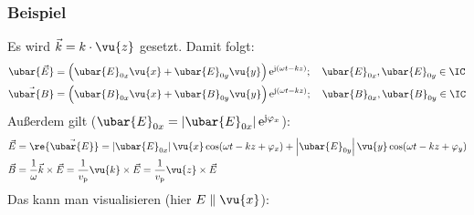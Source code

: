   \subsubsection{Beispiel}        
     Es wird \(\vec{k} =  k \cdot \vu{z}\) gesetzt. Damit folgt:
      \begin{equation*}\begin{split}
         \ubar{\vec{E}}&=\left( \ubar{E}_{0x} \vu{x} + \ubar{E}_{0y}\vu{y}\right)  \mathrm{e}^{\mathrm{j}(\omega t - k z)}  ;\quad \ubar{E}_{0x}, \ubar{E}_{0y} \in \IC\\
        \vec{\ubar{B}} &= \left( \ubar{B}_{0x} \vu{x} + \ubar{B}_{0y}\vu{y}\right) \mathrm{e}^{\mathrm{j}(\omega t -  k z)}  ;\quad \ubar{B}_{0x}, \ubar{B}_{0y} \in \IC
       \end{split}\end{equation*}
	Außerdem gilt ($\ubar{E}_{0x}=\left|\ubar{E}_{0x}\right|\mathrm{e}^{\mathrm{j}\varphi_x}$):
		        \begin{equation*}\begin{split}
		        \vec{E}&=\re{\vec{\ubar{E}}}=\left|\ubar{E}_{0x}\right|\vu{x}\cos (\omega t - kz +\varphi_x)+\left|\ubar{E}_{0y}\right|\vu{y}\cos (\omega t - kz +\varphi_y)\\
			      \vec{B} &= \frac{1}{\omega}\vec{k}\times \vec{E} =  \frac{1}{ v_{\mathrm{p}}}\vu{k}\times\vec{E} = \frac{1}{ v_{\mathrm{p}}}\vu{z}\times\vec{E}       
		        \end{split}\end{equation*}
		 Das kann man visualisieren (hier $E\parallel \vu{x}$):
